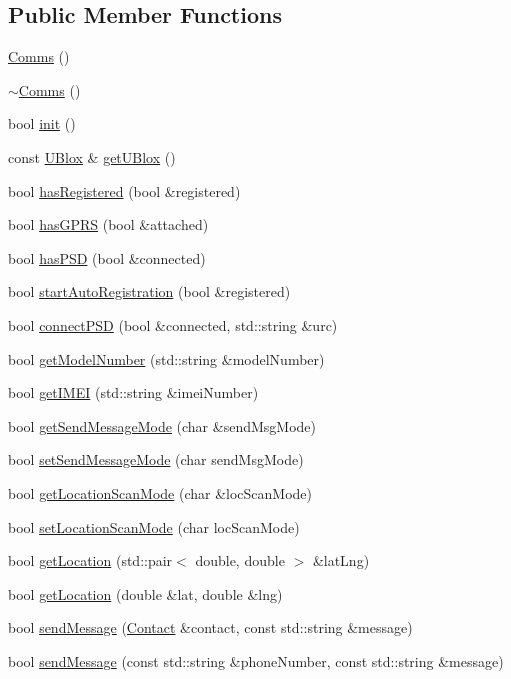 \subsection*{Public Member Functions}
\begin{DoxyCompactItemize}
\item 
\hyperlink{class_comms_aa3878221ed907d6d6841ee77741c1f49}{Comms} ()
\item 
\hyperlink{class_comms_ad18d3a80a82d18d27b0de3b551e4f5fc}{$\sim$\+Comms} ()
\item 
bool \hyperlink{class_comms_aa0519d3ed2d5bd6aad60101080ac2de7}{init} ()
\item 
const \hyperlink{class_u_blox}{U\+Blox} \& \hyperlink{class_comms_afdd15b4aeca5d91f2f263910c444c957}{get\+U\+Blox} ()
\item 
bool \hyperlink{class_comms_ae1fb7ac11bd07f21134335aec55bd833}{has\+Registered} (bool \&registered)
\item 
bool \hyperlink{class_comms_a583e3d933cca0c1eca9ec77e66bd6b84}{has\+G\+P\+RS} (bool \&attached)
\item 
bool \hyperlink{class_comms_a2c43ce409b48f4d28eefb7934cdd1523}{has\+P\+SD} (bool \&connected)
\item 
bool \hyperlink{class_comms_a9563254514d2f64c0427be2aeaba26d8}{start\+Auto\+Registration} (bool \&registered)
\item 
bool \hyperlink{class_comms_a6d720b51b543ec05b140efdde4cca824}{connect\+P\+SD} (bool \&connected, std\+::string \&urc)
\item 
bool \hyperlink{class_comms_a02eb048febea2d1a39a7fe9e064cf93c}{get\+Model\+Number} (std\+::string \&model\+Number)
\item 
bool \hyperlink{class_comms_ab545396d2360e34fd94e7c3a996e967d}{get\+I\+M\+EI} (std\+::string \&imei\+Number)
\item 
bool \hyperlink{class_comms_ade9963ad1f934a79a6b584dd7abfe515}{get\+Send\+Message\+Mode} (char \&send\+Msg\+Mode)
\item 
bool \hyperlink{class_comms_a1b6f5cafba74fc0e175f057e15656362}{set\+Send\+Message\+Mode} (char send\+Msg\+Mode)
\item 
bool \hyperlink{class_comms_a8f9893e235e62f8fc752f05a06383e68}{get\+Location\+Scan\+Mode} (char \&loc\+Scan\+Mode)
\item 
bool \hyperlink{class_comms_a73c0cd58db7daf118bd0b1726fc9dded}{set\+Location\+Scan\+Mode} (char loc\+Scan\+Mode)
\item 
bool \hyperlink{class_comms_a26030245503e82aa6278e39cd0886c31}{get\+Location} (std\+::pair$<$ double, double $>$ \&lat\+Lng)
\item 
bool \hyperlink{class_comms_a083b399b3115711b1e2d55f800cac58c}{get\+Location} (double \&lat, double \&lng)
\item 
bool \hyperlink{class_comms_a30ab10ea604ab2b169ca66f3f1071c0e}{send\+Message} (\hyperlink{class_contact}{Contact} \&contact, const std\+::string \&message)
\item 
bool \hyperlink{class_comms_ad28b072a0852ac95aa2475324cbfae60}{send\+Message} (const std\+::string \&phone\+Number, const std\+::string \&message)
\end{DoxyCompactItemize}
